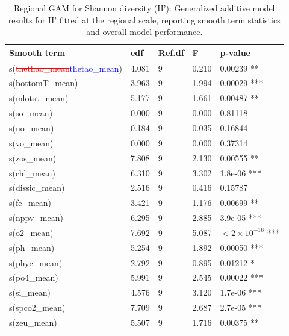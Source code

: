\documentclass[a4paper,fleqn]{cas-sc}
\DeclareRobustCommand{\deleted}[1]{\textcolor{red}{\sout{#1}}}
\DeclareRobustCommand{\added}[1]{\textcolor{blue}{#1}}
\begin{document}
\begin{table}[width=.9\linewidth,cols=5,pos=!htbp]
\caption{Regional GAM for Shannon diversity (H'): Generalized additive model results for H' fitted at the regional scale, reporting smooth term statistics and overall model performance.}
\small
\begin{tabular*}{\tblwidth}{@{} LLLLL @{}}
\toprule
\textbf{Smooth term} & \textbf{edf} & \textbf{Ref.df} & \textbf{F} & \textbf{p-value} \\
\midrule
s(\deleted{thethao\_mean}\added{thetao\_mean})      & 4.081 & 9 & 0.210 & 0.00239 ** \\
s(bottomT\_mean) & 3.963 & 9 & 1.994 & 0.00029 *** \\
s(mlotst\_mean)   & 5.177 & 9 & 1.661 & 0.00487 ** \\
s(so\_mean)       & 0.000 & 9 & 0.000 & 0.81118 \\
s(uo\_mean)       & 0.184 & 9 & 0.035 & 0.16844 \\
s(vo\_mean)       & 0.000 & 9 & 0.000 & 0.37314 \\
s(zos\_mean)      & 7.808 & 9 & 2.130 & 0.00555 ** \\
s(chl\_mean)      & 6.310 & 9 & 3.302 & 1.8e-06 *** \\
s(dissic\_mean)   & 2.516 & 9 & 0.416 & 0.15787 \\
s(fe\_mean)       & 3.421 & 9 & 1.176 & 0.00699 ** \\
s(nppv\_mean)     & 6.295 & 9 & 2.885 & 3.9e-05 *** \\
s(o2\_mean)       & 7.692 & 9 & 5.087 & $<2 \times 10^{-16}$ *** \\
s(ph\_mean)       & 5.254 & 9 & 1.892 & 0.00050 *** \\
s(phyc\_mean)     & 2.792 & 9 & 0.895 & 0.01212 * \\
s(po4\_mean)      & 5.991 & 9 & 2.545 & 0.00022 *** \\
s(si\_mean)       & 4.576 & 9 & 3.120 & 1.7e-06 *** \\
s(spco2\_mean)    & 7.709 & 9 & 2.687 & 2.7e-05 *** \\
s(zeu\_mean)      & 5.507 & 9 & 1.716 & 0.00375 ** \\
\bottomrule
\end{tabular*}
\label{tab:19}
\end{table}
\end{document}
